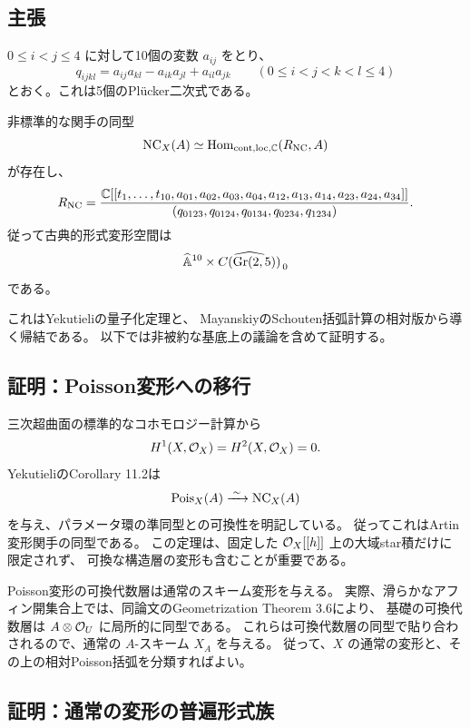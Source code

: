 \subsection{主張}

$0\leq i<j\leq4$ に対して10個の変数 $a_{ij}$ をとり、
\[
 q_{ijkl}=a_{ij}a_{kl}-a_{ik}a_{jl}+a_{il}a_{jk}
 \qquad(0\leq i<j<k<l\leq4)
\]
とおく。これは5個のPlücker二次式である。

\begin{theorem}[markedな古典的形式変形基底]\label{thm:base}
非標準的な関手の同型
\[
 \operatorname{NC}_X(A)\simeq\operatorname{Hom}_{\mathrm{cont,loc},\mathbb C}(R_{\operatorname{NC}},A)
\]
が存在し、
\begin{equation}\label{eq:base}
 R_{\operatorname{NC}}=
 \frac{\mathbb C[[t_1,\ldots,t_{10},a_{01},a_{02},a_{03},a_{04},
                         a_{12},a_{13},a_{14},a_{23},a_{24},a_{34}]]}
 {(q_{0123},q_{0124},q_{0134},q_{0234},q_{1234})}.
\end{equation}
従って古典的形式変形空間は
\[
 \widehat{\mathbb A}^{10}\times
 \widehat{C(\operatorname{Gr}(2,5))}_{\,0}
\]
である。
\end{theorem}

これはYekutieliの量子化定理\cite[Corollary 11.2]{Yek}と、
MayanskiyのSchouten括弧計算\cite[Section 2.2]{May}の相対版から導く帰結である。
以下では非被約な基底上の議論を含めて証明する。

\subsection{証明：Poisson変形への移行}

三次超曲面の標準的なコホモロジー計算から
\[
 H^1(X,\mathcal O_X)=H^2(X,\mathcal O_X)=0.
\]
YekutieliのCorollary 11.2は
\[
 \operatorname{Pois}_X(A)\xrightarrow{\;\sim\;}\operatorname{NC}_X(A)
\]
を与え、パラメータ環の準同型との可換性を明記している。
従ってこれはArtin変形関手の同型である。
この定理は、固定した $\mathcal O_X[[h]]$ 上の大域star積だけに限定されず、
可換な構造層の変形も含むことが重要である。

Poisson変形の可換代数層は通常のスキーム変形を与える。
実際、滑らかなアフィン開集合上では、同論文のGeometrization Theorem 3.6により、
基礎の可換代数層は $A\otimes\mathcal O_U$ に局所的に同型である。
これらは可換代数層の同型で貼り合わされるので、通常の $A$-スキーム $X_A$ を与える。
従って、$X$ の通常の変形と、その上の相対Poisson括弧を分類すればよい。

\subsection{証明：通常の変形の普遍形式族}

